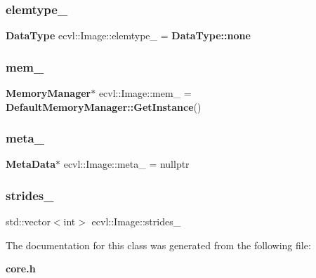 \mbox{\label{classecvl_1_1_image_a78886ac222536f1d6e8e83d868482b5a}} 
\subsubsection{elemtype\_}
{\footnotesize\ttfamily \textbf{ Data\+Type} ecvl\+::\+Image\+::elemtype\+\_\+ = \textbf{ Data\+Type\+::none}}

\mbox{\label{classecvl_1_1_image_a47c93cfe9efa12b380cc00cad3fb3d12}} 
\subsubsection{mem\_}
{\footnotesize\ttfamily \textbf{ Memory\+Manager}$\ast$ ecvl\+::\+Image\+::mem\+\_\+ = \textbf{ Default\+Memory\+Manager\+::\+Get\+Instance}()}

\mbox{\label{classecvl_1_1_image_a32383ca82c257c20e22b4587965d4566}} 
\subsubsection{meta\_}
{\footnotesize\ttfamily \textbf{ Meta\+Data}$\ast$ ecvl\+::\+Image\+::meta\+\_\+ = nullptr}

\mbox{\label{classecvl_1_1_image_a6a74e60fe9da7dd77117b50122d492cb}} 
\subsubsection{strides\_}
{\footnotesize\ttfamily std\+::vector$<$int$>$ ecvl\+::\+Image\+::strides\+\_\+}



The documentation for this class was generated from the following file\+:\begin{DoxyCompactItemize}
\item 
\textbf{ core.\+h}\end{DoxyCompactItemize}
